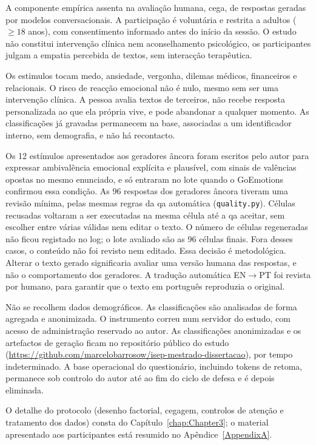 A componente empírica assenta na avaliação humana, cega, de respostas geradas por modelos conversacionais. A participação é voluntária e restrita a adultos (\(\ge 18\) anos), com consentimento informado antes do início da sessão. O estudo não constitui intervenção clínica nem aconselhamento psicológico, os participantes julgam a empatia percebida de textos, sem interacção terapêutica.

Os \glspl{estimulo} tocam medo, ansiedade, vergonha, dilemas médicos, financeiros e relacionais. O risco de reacção emocional não é nulo, mesmo sem ser uma intervenção clínica. A pessoa avalia textos de terceiros, não recebe resposta personalizada ao que ela própria vive, e pode abandonar a qualquer momento. As classificações já gravadas permanecem na base, associadas a um identificador interno, sem demografia, e não há recontacto.

Os 12 estímulos apresentados aos geradores âncora foram escritos pelo autor para expressar ambivalência emocional explícita e plausível, com sinais de valências opostas no mesmo enunciado, e só entraram no lote quando o GoEmotions confirmou essa condição. As 96 respostas dos geradores âncora tiveram uma revisão mínima, pelas mesmas regras da \gls{qa} automática (\texttt{quality.py}). Células recusadas voltaram a ser executadas na mesma célula até a \gls{qa} aceitar, sem escolher entre várias válidas nem editar o texto. O número de células regeneradas não ficou registado no log; o lote avaliado são as 96 células finais. Fora desses casos, o conteúdo não foi revisto nem editado. Essa decisão é metodológica. Alterar o texto gerado significaria avaliar uma versão humana das respostas, e não o comportamento dos geradores. A tradução automática EN\(\rightarrow\)PT foi revista por humano, para garantir que o texto em português reproduzia o original.

Não se recolhem dados demográficos. As classificações são analisadas de forma agregada e anonimizada. O instrumento correu num servidor do estudo, com acesso de administração reservado ao autor. As classificações anonimizadas e os artefactos de geração ficam no repositório público do estudo (\url{https://github.com/marcelobarrosow/isep-mestrado-dissertacao}), por tempo indeterminado. A base operacional do questionário, incluindo tokens de retoma, permanece sob controlo do autor até ao fim do ciclo de defesa e é depois eliminada.

O detalhe do protocolo (desenho factorial, cegagem, controlos de atenção e tratamento dos dados) consta do Capítulo~\ref{chap:Chapter3}; o material apresentado aos participantes está resumido no Apêndice~\ref{AppendixA}.

